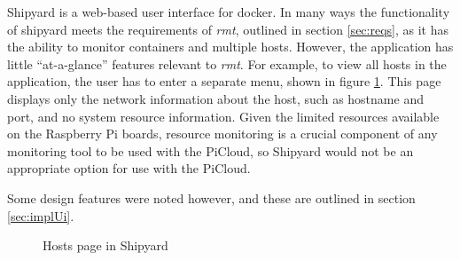 Shipyard \citep{shipyard} is a web-based user interface for docker.
In many ways the functionality of shipyard meets the requirements of \emph{rmt}, outlined in section \ref{sec:reqs}, as it has the ability to monitor containers and multiple hosts.
However, the application has little ``at-a-glance'' features relevant to \emph{rmt}.
For example, to view all hosts in the application, the user has to enter a separate menu, shown in figure \ref{fig:shipyardHosts}.
This page displays only the network information about the host, such as hostname and port, and no system resource information.
Given the limited resources available on the Raspberry Pi boards, resource monitoring is a crucial component of any monitoring tool to be used with the PiCloud, so Shipyard would not be an appropriate option for use with the PiCloud.

Some design features were noted however, and these are outlined in section \ref{sec:implUi}.

\begin{figure}[t]
	\centering
	\setlength\fboxsep{0pt}
	\setlength\fboxrule{0.5pt}
	\caption{Hosts page in Shipyard}
	\label{fig:shipyardHosts}
\end{figure}
